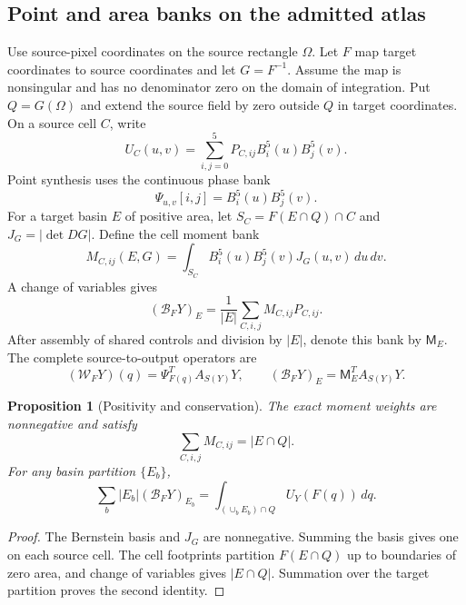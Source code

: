 \documentclass[journal]{IEEEtran}
\newtheorem{proposition}{Proposition}
\begin{document}
\subsection{Point and area banks on the admitted atlas}
Use source-pixel coordinates on the source rectangle $\Omega$. Let
$F$ map target coordinates to source coordinates and let $G=F^{-1}$.
Assume the map is nonsingular and has no denominator zero on the domain of
integration. Put $Q=G(\Omega)$ and extend the source field by zero outside
$Q$ in target coordinates. On a source cell $C$, write
\begin{equation}
 U_C(u,v)=\sum_{i,j=0}^5P_{C,ij}B_i^5(u)B_j^5(v).
\end{equation}
Point synthesis uses the continuous phase bank
\begin{equation}
 \Psi_{u,v}[i,j]=B_i^5(u)B_j^5(v).
 \label{eq:starphasebank}
\end{equation}
For a target basin $E$ of positive area, let
$S_C=F(E\cap Q)\cap C$ and $J_G=|\det DG|$. Define the cell moment bank
\begin{equation}
 M_{C,ij}(E,G)=\int_{S_C}B_i^5(u)B_j^5(v)J_G(u,v)\,du\,dv.
 \label{eq:starmomentbank}
\end{equation}
A change of variables gives
\begin{equation}
 (\mathcal B_FY)_E=\frac1{|E|}\sum_{C,i,j}M_{C,ij}P_{C,ij}.
 \label{eq:starareabank}
\end{equation}
After assembly of shared controls and division by $|E|$, denote this bank
by $\mathsf M_E$. The complete source-to-output operators are
\begin{equation}
 (\mathcal W_FY)(q)=\Psi_{F(q)}^TA_{S(Y)}Y,\qquad
 (\mathcal B_FY)_E=\mathsf M_E^TA_{S(Y)}Y.
\end{equation}

\begin{proposition}[Positivity and conservation]
The exact moment weights are nonnegative and satisfy
\begin{equation}
 \sum_{C,i,j}M_{C,ij}=|E\cap Q|.
\end{equation}
For any basin partition $\{E_b\}$,
\begin{equation}
 \sum_b|E_b|(\mathcal B_FY)_{E_b}
 =\int_{(\cup_bE_b)\cap Q}U_Y(F(q))\,dq.
\end{equation}
\end{proposition}
\begin{proof}
The Bernstein basis and $J_G$ are nonnegative. Summing the basis gives one
on each source cell. The cell footprints partition $F(E\cap Q)$ up to
boundaries of zero area, and change of variables gives $|E\cap Q|$.
Summation over the target partition proves the second identity.
\end{proof}
\end{document}
